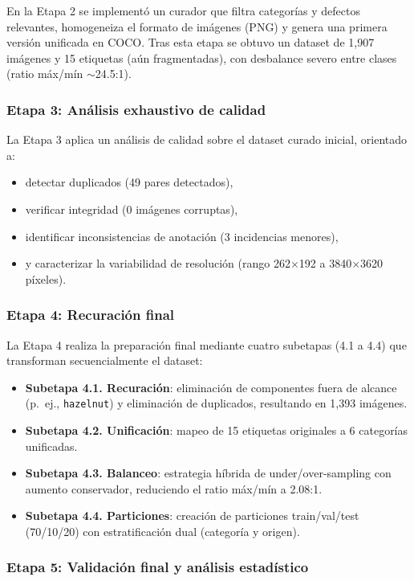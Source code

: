 En la Etapa 2 se implementó un curador que filtra categorías y defectos relevantes, homogeneiza el formato de imágenes (PNG) y genera una primera versión unificada en COCO. Tras esta etapa se obtuvo un dataset de 1{,}907 imágenes y 15 etiquetas (aún fragmentadas), con desbalance severo entre clases (ratio máx/mín $\sim$24.5:1).

\subsubsection{Etapa 3: Análisis exhaustivo de calidad}

La Etapa 3 aplica un análisis de calidad sobre el dataset curado inicial, orientado a:
\begin{itemize}
    \item detectar duplicados (49 pares detectados),
    \item verificar integridad (0 imágenes corruptas),
    \item identificar inconsistencias de anotación (3 incidencias menores),
    \item y caracterizar la variabilidad de resolución (rango 262$\times$192 a 3840$\times$3620 píxeles).
\end{itemize}

\subsubsection{Etapa 4: Recuración final}

La Etapa 4 realiza la preparación final mediante cuatro subetapas (4.1 a 4.4) que transforman secuencialmente el dataset:
\begin{itemize}
    \item \textbf{Subetapa 4.1. Recuración}: eliminación de componentes fuera de alcance (p.\ ej., \texttt{hazelnut}) y eliminación de duplicados, resultando en 1{,}393 imágenes.
    \item \textbf{Subetapa 4.2. Unificación}: mapeo de 15 etiquetas originales a 6 categorías unificadas.
    \item \textbf{Subetapa 4.3. Balanceo}: estrategia híbrida de under/over-sampling con aumento conservador, reduciendo el ratio máx/mín a 2.08:1.
    \item \textbf{Subetapa 4.4. Particiones}: creación de particiones train/val/test (70/10/20) con estratificación dual (categoría y origen).
\end{itemize}

\subsubsection{Etapa 5: Validación final y análisis estadístico}


